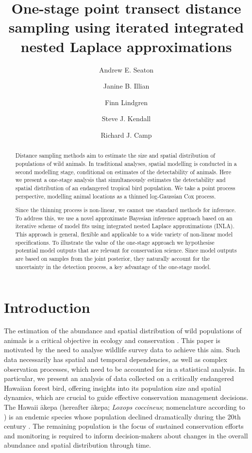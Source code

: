 \documentclass{statsoc}
\title[One-stage point transect distance sampling using iterated INLA]{One-stage point transect distance sampling using iterated integrated nested Laplace approximations}
\author[Andrew E. Seaton {\it et al.}]{Andrew E. Seaton}
\author{Janine B. Illian}
\author{Finn Lindgren}
\author{Steve J. Kendall}
\author{Richard J. Camp}
\newcommand{\akepa}{\textquotesingle\={a}kepa}  %
\newcommand{\hawaii}{Hawai\textquotesingle i}   %
\begin{document}
\begin{abstract}
Distance sampling methods aim to estimate the size and spatial distribution of populations of wild animals.  In traditional analyses, spatial modelling is conducted in a second modelling stage, conditional on estimates of the detectability of animals. Here we present a one-stage analysis that simultaneously estimates the detectability and spatial distribution of an endangered tropical bird population.  We take a point process perspective, modelling animal locations as a thinned log-Gaussian Cox process.

Since the thinning process is non-linear, we cannot use standard methods for inference. To address this, we use a novel approximate Bayesian inference approach based on an iterative scheme of model fits using integrated nested Laplace approximations (INLA). This approach is general, flexible and applicable to a wide variety of non-linear model specifications. To illustrate the value of the one-stage approach we hypothesise potential model outputs that are relevant for conservation science.  Since model outputs are based on samples from the joint posterior, they naturally account for the uncertainty in the detection process, a key advantage of the one-stage model.

\end{abstract}


\section{Introduction}

The estimation of the abundance and spatial distribution of wild populations of animals is a critical objective in ecology and conservation \citep{schwarz_estimating_1999}. This paper is motivated by the need to analyse wildlife survey data to achieve this aim.  Such data necessarily has spatial and temporal dependencies, as well as complex observation processes, which need to be accounted for in a statistical analysis.  In particular, we present an analysis of data collected on a critically endangered Hawaiian forest bird, offering insights into its population size and spatial dynamics, which are crucial to guide effective conservation management decisions.  The \hawaii{} \akepa{} (hereafter \akepa{}; \textit{Loxops coccineus}; nomenclature according to \citealp{usfws_akepa_1970}) is an endemic species whose population declined dramatically during the 20th century  \citep{usfws_revised_2006, judge_akepa_2018}.  The remaining population is the focus of sustained conservation efforts and monitoring is required to inform decision-makers about changes in the overall abundance and spatial distribution through time.
\end{document}
